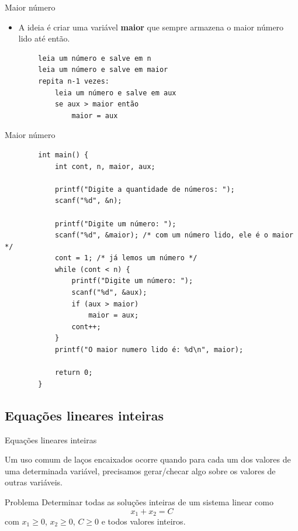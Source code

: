 \documentclass[handout]{beamer}
\begin{document}
\begin{frame}[fragile]{Maior número}
  
    \begin{itemize}
        \item A ideia é criar uma variável {\bf maior} que sempre armazena o maior número lido até então.
    \end{itemize}

    \begin{verbatim}
        leia um número e salve em n
        leia um número e salve em maior
        repita n-1 vezes:
            leia um número e salve em aux
            se aux > maior então
                maior = aux
    \end{verbatim}
\end{frame}

\begin{frame}[fragile]{Maior número}

    \begin{verbatim}
        int main() {
            int cont, n, maior, aux;

            printf("Digite a quantidade de números: ");
            scanf("%d", &n);

            printf("Digite um número: ");
            scanf("%d", &maior); /* com um número lido, ele é o maior */
            cont = 1; /* já lemos um número */
            while (cont < n) {
                printf("Digite um número: ");
                scanf("%d", &aux);
                if (aux > maior)
                    maior = aux;
                cont++;
            }
            printf("O maior numero lido é: %d\n", maior);

            return 0;
        }
    \end{verbatim}
\end{frame}

\subsection{Equações lineares inteiras}%

\begin{frame}[fragile]{Equações lineares inteiras}

    Um uso comum de laços encaixados ocorre quando para cada um dos valores de uma determinada variável, precisamos gerar/checar algo sobre os valores de outras variáveis.

    \begin{block}{Problema}
        Determinar todas as soluções inteiras de um sistema linear como
        $$x_1 + x_ 2 = C$$
        com $x_1 \geq 0$, $x_2 \geq 0$, $C \geq 0$ e todos valores inteiros.
    \end{block}
\end{frame}
\end{document}
